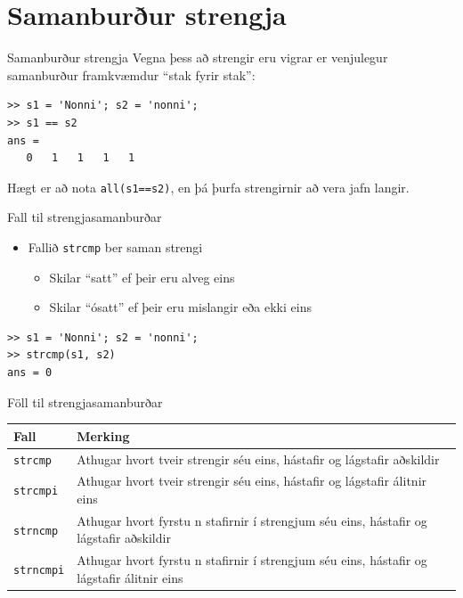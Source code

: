 \documentclass[handout]{beamer}
\begin{document}
\section{Samanburður strengja}

\begin{frame}[fragile]{Samanburður strengja}
Vegna þess að strengir eru vigrar er venjulegur samanburður framkvæmdur ``stak fyrir stak'':
\begin{verbatim}
>> s1 = 'Nonni'; s2 = 'nonni';
>> s1 == s2
ans =
   0   1   1   1   1
\end{verbatim}
Hægt er að nota \texttt{all(s1==s2)}, en þá þurfa strengirnir að vera jafn langir.
\end{frame}

\begin{frame}[fragile]{Fall til strengjasamanburðar}
\begin{itemize}
 \item Fallið \texttt{strcmp} ber saman strengi
 \begin{itemize}
  \item Skilar ``satt'' ef þeir eru alveg eins
  \item Skilar ``ósatt'' ef þeir eru mislangir eða ekki eins
 \end{itemize}
\end{itemize}
\begin{verbatim}
>> s1 = 'Nonni'; s2 = 'nonni';
>> strcmp(s1, s2)
ans = 0
\end{verbatim}
\end{frame}

\begin{frame}{Föll til strengjasamanburðar}
\vspace{\baselineskip}
\begin{center}
\begin{tabular}{lp{8cm}}
\toprule
Fall&Merking\\
\midrule
\texttt{strcmp}&Athugar hvort tveir strengir séu eins, hástafir og lágstafir aðskildir\\
\texttt{strcmpi}&Athugar hvort tveir strengir séu eins, hástafir og lágstafir álitnir eins\\
\texttt{strncmp}&Athugar hvort fyrstu n stafirnir í strengjum séu eins, hástafir og lágstafir aðskildir\\
\texttt{strncmpi}&Athugar hvort fyrstu n stafirnir í strengjum séu eins, hástafir og lágstafir álitnir eins\\
\bottomrule
\end{tabular}
\end{center}
\end{frame}
\end{document}
